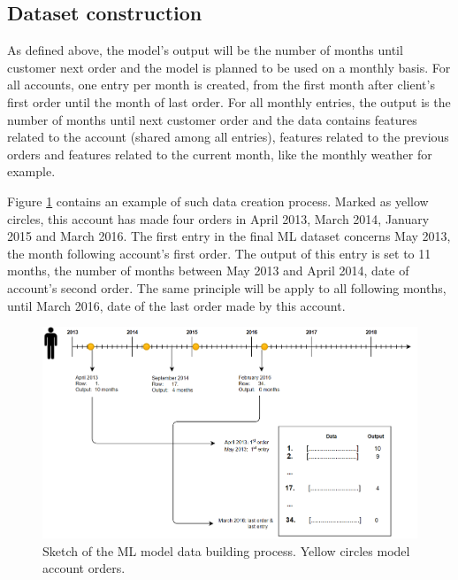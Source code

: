 \subsection{Dataset construction}\label{sec:data-shape-for-ml}
As defined above, the model's output will be the number of months until customer next order and the model is planned to be used on a monthly basis. For all accounts, one entry per month is created, from the first month after client's first order until the month of last order. For all monthly entries, the output is the number of months until next customer order and the data contains features related to the account (shared among all entries), features related to the previous orders and features related to the current month, like the monthly weather for example. 

Figure \ref{fig:data-build-example} contains an example of such data creation process. Marked as yellow circles, this account has made four orders in April 2013, March 2014, January 2015 and March 2016. The first entry in the final ML dataset concerns May 2013, the month following account's first order. The output of this entry is set to 11 months, the number of months between May 2013 and April 2014, date of account's second order. The same principle will be apply to all following months, until March 2016, date of the last order made by this account.

\begin{figure}[h]
    \centering
    \includegraphics[width=14cm]{images/data-build-ml-example.png}
    \caption[Process to build data for machine learning]{Sketch of the ML model data building process. Yellow circles model account orders.}
    \label{fig:data-build-example}
\end{figure}


